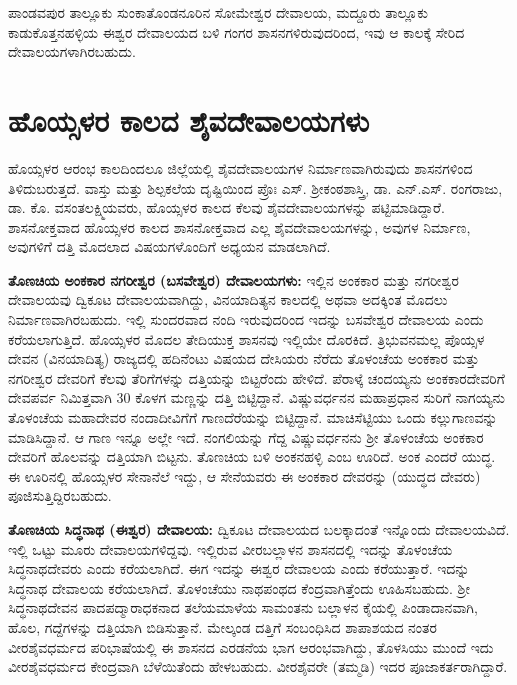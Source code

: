 ಪಾಂಡವಪುರ ತಾಲ್ಲೂಕು ಸುಂಕಾತೊಂಡನೂರಿನ ಸೋಮೇಶ್ವರ ದೇವಾಲಯ, ಮದ್ದೂರು ತಾಲ್ಲೂಕು ಕಾಡುಕೊತ್ತನಹಳ್ಳಿಯ ಈಶ್ವರ ದೇವಾಲಯದ ಬಳಿ ಗಂಗರ ಶಾಸನಗಳಿರುವುದರಿಂದ, ಇವು ಆ ಕಾಲಕ್ಕೆ ಸೇರಿದ ದೇವಾಲಯಗಳಾಗಿರಬಹುದು.


\section{ಹೊಯ್ಸಳರ ಕಾಲದ ಶೈವದೇವಾಲಯಗಳು}

ಹೊಯ್ಸಳರ ಆರಂಭ ಕಾಲದಿಂದಲೂ ಜಿಲ್ಲೆಯಲ್ಲಿ ಶೈವದೇವಾಲಯಗಳ ನಿರ್ಮಾಣವಾಗಿರುವುದು ಶಾಸನಗಳಿಂದ ತಿಳಿದುಬರುತ್ತದೆ. ವಾಸ್ತು ಮತ್ತು ಶಿಲ್ಪಕಲೆಯ ದೃಷ್ಟಿಯಿಂದ ಪ್ರೊಃ ಎಸ್​. ಶ‍್ರೀಕಂಠಶಾಸ್ತ್ರಿ, ಡಾ. ಎನ್​.ಎಸ್​. ರಂಗರಾಜು, ಡಾ. ಕೊ. ವಸಂತಲಕ್ಷ್ಮಿಯವರು, ಹೊಯ್ಸಳರ ಕಾಲದ ಕೆಲವು ಶೈವದೇವಾಲಯಗಳನ್ನು ಪಟ್ಟಿಮಾಡಿದ್ದಾರೆ. ಶಾಸನೋಕ್ತವಾದ ಹೊಯ್ಸಳರ ಕಾಲದ ಶಾಸನೋಕ್ತವಾದ ಎಲ್ಲ ಶೈವದೇವಾಲಯಗಳನ್ನು, ಅವುಗಳ ನಿರ್ಮಾಣ, ಅವುಗಳಿಗೆ ದತ್ತಿ ಮೊದಲಾದ ವಿಷಯಗಳೊಂದಿಗೆ ಅಧ್ಯಯನ ಮಾಡಲಾಗಿದೆ.

\textbf{ತೊಣಚಿಯ ಅಂಕಕಾರ ನಗರೀಶ್ವರ (ಬಸವೇಶ್ವರ) ದೇವಾಲಯಗಳು:} ಇಲ್ಲಿನ ಅಂಕಕಾರ ಮತ್ತು ನಗರೀಶ್ವರ ದೇವಾಲಯವು ದ್ವಿಕೂಟ ದೇವಾಲಯವಾಗಿದ್ದು, ವಿನಯಾದಿತ್ಯನ ಕಾಲದಲ್ಲಿ ಅಥವಾ ಅದಕ್ಕಿಂತ ಮೊದಲು ನಿರ್ಮಾಣವಾಗಿರಬಹುದು. ಇಲ್ಲಿ ಸುಂದರವಾದ ನಂದಿ ಇರುವುದರಿಂದ ಇದನ್ನು ಬಸವೇಶ್ವರ ದೇವಾಲಯ ಎಂದು ಕರೆಯಲಾಗುತ್ತಿದೆ. ಹೊಯ್ಸಳರ ಮೊದಲ ತೇದಿಯುಕ್ತ ಶಾಸನವು ಇಲ್ಲಿಯೇ ದೊರಕಿದೆ. ತ್ರಿಭುವನಮಲ್ಲ ಪೊಯ್ಸಳ ದೇವನ (ವಿನಯಾದಿತ್ಯ) ರಾಜ್ಯದಲ್ಲಿ ಹದಿನೆಂಟು ವಿಷಯದ ದೇಸಿಯರು ನೆರೆದು ತೊಳಂಚೆಯ ಅಂಕಕಾರ ಮತ್ತು ನಗರೀಶ್ವರ ದೇವರಿಗೆ ಕೆಲವು ತೆರಿಗೆಗಳನ್ನು ದತ್ತಿಯನ್ನು ಬಿಟ್ಟರೆಂದು ಹೇಳಿದೆ. ಪೆರಾಳ್ಕೆ ಚಂದಯ್ಯನು ಅಂಕಕಾರದೇವರಿಗೆ ದೇವಪರ್ವ ನಿಮಿತ್ತವಾಗಿ 30 ಕೊಳಗ ಮಣ್ಣನ್ನು ದತ್ತಿ ಬಿಟ್ಟಿದ್ದಾನೆ. ವಿಷ್ಣುವರ್ಧನನ ಮಹಾಪ್ರಧಾನ ಸುರಿಗೆ ನಾಗಯ್ಯನು ತೊಳಂಚೆಯ ಮಹಾದೇವರ ನಂದಾದೀವಿಗೆಗೆ ಗಾಣದೆರೆಯನ್ನು ಬಿಟ್ಟಿದ್ದಾನೆ. ಮಾಚಿಸೆಟ್ಟಿಯು ಒಂದು ಕಲ್ಲುಗಾಣವನ್ನು ಮಾಡಿಸಿದ್ದಾನೆ. ಆ ಗಾಣ ಇನ್ನೂ ಅಲ್ಲೇ ಇದೆ. ನಂಗಲಿಯನ್ನು ಗೆದ್ದ ವಿಷ್ಣುವರ್ಧನನು ಶ‍್ರೀ ತೊಳಂಚೆಯ ಅಂಕಕಾರ ದೇವರಿಗೆ ಹೊಲವನ್ನು ದತ್ತಿಯಾಗಿ ಬಿಟ್ಟನು. ತೊಣಚಿಯ ಬಳಿ ಅಂಕನಹಳ್ಳಿ ಎಂಬ ಊರಿದೆ. ಅಂಕ ಎಂದರೆ ಯುದ್ಧ. ಈ ಊರಿನಲ್ಲಿ ಹೊಯ್ಸಳರ ಸೇನಾನೆಲೆ ಇದ್ದು, ಆ ಸೇನೆಯವರು ಈ ಅಂಕಕಾರ ದೇವರನ್ನು (ಯುದ್ಧದ ದೇವರು) ಪೂಜಿಸುತ್ತಿದ್ದಿರಬಹುದು.

\textbf{ತೊಣಚಿಯ ಸಿದ್ಧನಾಥ (ಈಶ್ವರ) ದೇವಾಲಯ:} ದ್ವಿಕೂಟ ದೇವಾಲಯದ ಬಲಕ್ಕಾದಂತೆ ಇನ್ನೊಂದು ದೇವಾಲಯವಿದೆ. ಇಲ್ಲಿ ಒಟ್ಟು ಮೂರು ದೇವಾಲಯಗಳಿದ್ದವು. ಇಲ್ಲಿರುವ ವೀರಬಲ್ಲಾಳನ ಶಾಸನದಲ್ಲಿ ಇದನ್ನು ತೊಳಂಚೆಯ ಸಿದ್ಧನಾಥದೇವರು ಎಂದು ಕರೆಯಲಾಗಿದೆ. ಈಗ ಇದನ್ನು ಈಶ್ವರ ದೇವಾಲಯ ಎಂದು ಕರೆಯುತ್ತಾರೆ. ಇದನ್ನು ಸಿದ್ಧನಾಥ ದೇವಾಲಯ ಕರೆಯಲಾಗಿದೆ. ತೊಳಂಚೆಯು ನಾಥಪಂಥದ ಕೆಂದ್ರವಾಗಿತ್ತೆಂದು ಊಹಿಸಬಹುದು. ಶ‍್ರೀ ಸಿದ್ಧನಾಥದೇವನ ಪಾದಪದ್ಮಾರಾಧಕನಾದ ತಲೆಯಮಾಳೆಯ ಸಾಮಂತನು ಬಲ್ಲಾಳನ ಕೈಯಲ್ಲಿ ಪಿಂಡಾದಾನವಾಗಿ, ಹೊಲ, ಗದ್ದೆಗಳನ್ನು ದತ್ತಿಯಾಗಿ ಬಿಡಿಸುತ್ತಾನೆ. ಮೇಲ್ಕಂಡ ದತ್ತಿಗೆ ಸಂಬಂಧಿಸಿದ ಶಾಪಾಶಯದ ನಂತರ ವೀರಶೈವಧರ್ಮದ ಪರಿಭಾಷೆಯಲ್ಲಿ ಈ ಶಾಸನದ ಎರಡನೆಯ ಭಾಗ ಆರಂಭವಾಗಿದ್ದು, ತೊಳಸಿಯು ಮುಂದೆ ಇದು ವೀರಶೈವಧರ್ಮದ ಕೇಂದ್ರವಾಗಿ ಬೆಳೆಯಿತೆಂದು ಹೇಳಬಹುದು. ವೀರಶೈವರೇ (ತಮ್ಮಡಿ) ಇದರ ಪೂಜಾಕರ್ತರಾಗಿದ್ದಾರೆ.


